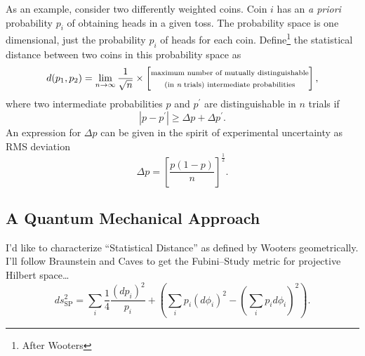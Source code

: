 As an example, consider two differently weighted coins.  Coin $i$ has
an {\it a priori} probability $p_i$ of obtaining heads in a given toss.
The probability space is one dimensional, just the probability 
$p_i$ of heads for each coin.
Define\footnote{After Wooters\cite{Wooters:81}} 
the statistical distance between two coins in this probability space as
\begin{equation}
d(p_1,p_2) = \lim_{n\to\infty} \frac{1}{\sqrt{n}}\times
    \left[\begin{matrix}
        \text{\scriptsize maximum number of mutually distinguishable}\\
        \text{\scriptsize (in {\it n} trials) intermediate probabilities}
    \end{matrix}\right],
\label{e:ClassicalDistance}
\end{equation}
where two intermediate probabilities $p$ and $p^\prime$ are distinguishable
in $n$ trials if 
\begin{equation}
\left| p-p^\prime \right| \ge \Delta p + \Delta p^\prime.
\end{equation}
An expression for $\Delta p$ can be given in the spirit of experimental
uncertainty as RMS deviation
\begin{equation}
\Delta p = \left[ \frac{p(1-p)}{n} \right]^\frac{1}{2}.
\end{equation}


\subsection{A Quantum Mechanical Approach}
\label{ssec:qmapproach}

I'd like to characterize ``Statistical Distance'' as defined by Wooters\cite{Wooters:81}
geometrically.  I'll follow Braunstein and Caves\cite{Braunstein/Caves:94}
to get the Fubini--Study metric for projective Hilbert space\dots
\begin{equation}
                ds_{\text{SP}}^2 = \sum_i \frac{1}{4}\frac{(dp_i)^2}{p_i} + 
                \left( 
                    \sum_i p_i(d\phi_i)^2 - \left( \sum_i p_i d\phi_i \right)^2
                \right).
\label{e:fsStatistical}
\end{equation}

